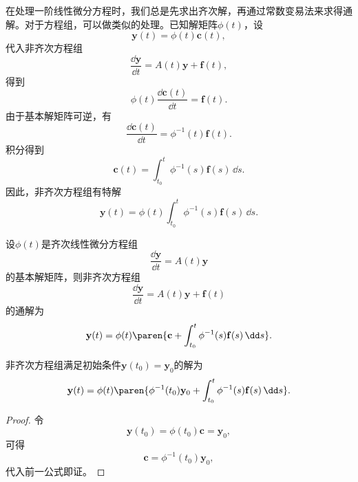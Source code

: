 在处理一阶线性微分方程时，我们总是先求出齐次解，再通过常数变易法来求得通解。对于方程组，可以做类似的处理。已知解矩阵$\phi(t)$，设
\begin{equation}
    \mathbf{y}(t)=\phi(t)\mathbf{c}(t),
\end{equation}
代入非齐次方程组
\begin{equation}
    \frac{\dd\mathbf{y}}{\dd t}=A(t)\mathbf{y}+\mathbf{f}(t),
\end{equation}
得到
\begin{equation}
    \phi(t)\frac{\dd\mathbf{c}(t)}{\dd t}=\mathbf{f}(t).
\end{equation}
由于基本解矩阵可逆，有
\begin{equation}
    \frac{\dd\mathbf{c}(t)}{\dd t}=\phi^{-1}(t)\mathbf{f}(t).
\end{equation}
积分得到
\begin{equation}
    \mathbf{c}(t)=\int_{t_0}^t \phi^{-1}(s)\mathbf{f}(s)\,\dd s.
\end{equation}
因此，非齐次方程组有特解
\begin{equation}
    \mathbf{y}(t)=\phi(t)\int_{t_0}^t \phi^{-1}(s)\mathbf{f}(s)\,\dd s.
\end{equation}
\begin{theorem}
    设$\phi(t)$是齐次线性微分方程组
    \begin{equation}
        \frac{\dd\mathbf{y}}{\dd t}=A(t)\mathbf{y}
    \end{equation}
    的基本解矩阵，则非齐次方程组
    \begin{equation}
        \frac{\dd\mathbf{y}}{\dd t}=A(t)\mathbf{y}+\mathbf{f}(t)
    \end{equation}
    的通解为
    \begin{equation}
        \mathbf{y}(t)=\phi(t)\paren{\mathbf{c}+\int_{t_0}^t \phi^{-1}(s)\mathbf{f}(s)\,\dd s}.
    \end{equation}
\end{theorem}

\begin{corollary}
    非齐次方程组满足初始条件$\mathbf{y}(t_0)=\mathbf{y}_0$的解为
    \begin{equation}
        \mathbf{y}(t)=\phi(t)\paren{\phi^{-1}(t_0)\mathbf{y}_0+\int_{t_0}^t \phi^{-1}(s)\mathbf{f}(s)\,\dd s}.
    \end{equation}
\end{corollary}

\begin{proof}
    令
    \begin{equation}
        \mathbf{y}(t_0)=\phi(t_0)\mathbf{c}=\mathbf{y}_0,
    \end{equation}
    可得
    \begin{equation}
        \mathbf{c}=\phi^{-1}(t_0)\mathbf{y}_0,
    \end{equation}
    代入前一公式即证。
\end{proof}

